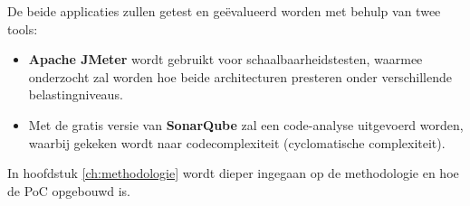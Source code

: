 De beide applicaties zullen getest en geëvalueerd worden met behulp van twee tools:

\begin{itemize}
	\item \textbf{Apache JMeter} wordt gebruikt voor schaalbaarheidstesten, waarmee onderzocht zal worden hoe beide architecturen presteren onder verschillende belastingniveaus.
	\item Met de gratis versie van \textbf{SonarQube} zal een code-analyse uitgevoerd worden, waarbij gekeken wordt naar codecomplexiteit (cyclomatische complexiteit).
\end{itemize}

In hoofdstuk \ref{ch:methodologie} wordt dieper ingegaan op de methodologie en hoe de PoC opgebouwd is.





